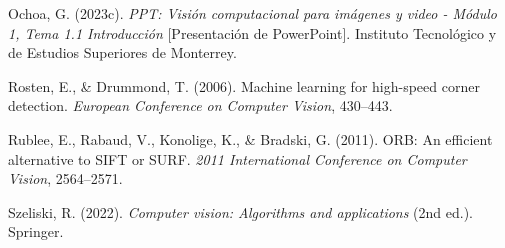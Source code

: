 \documentclass[12pt,letterpaper]{article}
\begin{document}
\begin{thebibliography}{99}
Ochoa, G. (2023c). \textit{PPT: Visión computacional para imágenes y video - Módulo 1, Tema 1.1 Introducción} [Presentación de PowerPoint]. Instituto Tecnológico y de Estudios Superiores de Monterrey.

Rosten, E., \& Drummond, T. (2006). Machine learning for high-speed corner detection. \textit{European Conference on Computer Vision}, 430--443.

Rublee, E., Rabaud, V., Konolige, K., \& Bradski, G. (2011). ORB: An efficient alternative to SIFT or SURF. \textit{2011 International Conference on Computer Vision}, 2564--2571.

Szeliski, R. (2022). \textit{Computer vision: Algorithms and applications} (2nd ed.). Springer.


\end{thebibliography}

% 
%
%
\end{document}
